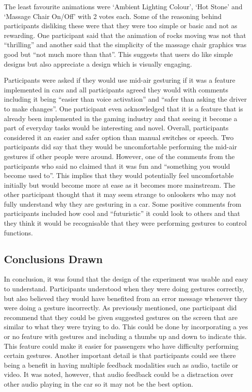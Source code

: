 \documentclass{l4proj}
\begin{document}
The least favourite animations were ‘Ambient Lighting Colour’, ‘Hot Stone’ and ‘Massage Chair On/Off’ with 2 votes each. Some of the reasoning behind participants disliking these were that they were too simple or basic and not as rewarding. One participant said that the animation of rocks moving was not that “thrilling” and another said that the simplicity of the massage chair graphics was good but “not much more than that”. This suggests that users do like simple designs but also appreciate a design which is visually engaging. 

Participants were asked if they would use mid-air gesturing if it was a feature implemented in cars and all participants agreed they would with comments including it being “easier than voice activation” and “safer than asking the driver to make changes”. One participant even acknowledged that it is a feature that is already been implemented in the gaming industry and that seeing it become a part of everyday tasks would be interesting and novel. Overall, participants considered it an easier and safer option than manual switches or speech. Two participants did say that they would be uncomfortable performing the mid-air gestures if other people were around. However, one of the comments from the participants who said no claimed that it was fun and “something you would become used to”. This implies that they would potentially feel uncomfortable initially but would become more at ease as it becomes more mainstream. The other participant thought that it may seem strange to onlookers who may not fully understand why they are gesturing in a car. Some positive comments from participants included how cool and “futuristic” it could look to others and that they think it would be recognisable that they were performing gestures to control functions.  

\subsection{Conclusions Drawn}
In conclusion, it was found that the design of the experiment was usable and easy to understand. Participants understood when they were doing gestures correctly, but also believed they would have benefited from an error message whenever they were doing a gesture incorrectly. As previously mentioned, one participant did recommend that they could be given suggested gestures on the screen that are similar to what they were trying to do. This could be done by incorporating a yes or no feature with gestures and including a thumbs up and down to indicate this. This feature could make it easier for passengers who have difficulty performing certain gestures. Another important detail is that participants could see there being a benefit in having multiple feedback modalities such as audio, tactile or video. It was noted, however, that audio feedback could be a distraction over other audio playing in the car so it may not be the best option. 
\end{document}
